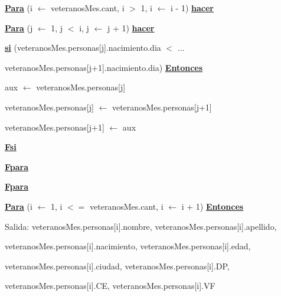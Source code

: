 \documentclass{article}
\begin{document}
            \hspace{12mm}\underline{\textbf{Para}} (i $\leftarrow$ veteranosMes.cant, i $>$ 1, i $\leftarrow$ i - 1) \underline{\textbf{hacer}}
            
                \hspace{16mm}\underline{\textbf{Para}} (j $\leftarrow$ 1, j $<$ i, j $\leftarrow$ j + 1) \underline{\textbf{hacer}}

                    \hspace{20mm}\underline{\textbf{si}} (veteranosMes.personas[j].nacimiento.dia $<$ ...
                    
                        \hspace{34mm}veteranosMes.personas[j+1].nacimiento.dia) \underline{\textbf{Entonces}}

                        \hspace{24mm}aux $\leftarrow$ veteranosMes.personas[j]

                        \hspace{24mm}veteranosMes.personas[j] $\leftarrow$ veteranosMes.personas[j+1]

                        \hspace{24mm}veteranosMes.personas[j+1] $\leftarrow$ aux

                    \hspace{20mm}\underline{\textbf{Fsi}}

                \hspace{16mm}\underline{\textbf{Fpara}}

            \hspace{12mm}\underline{\textbf{Fpara}}
    
            \hspace{12mm}\underline{\textbf{Para}} (i $\leftarrow$ 1, i $<=$ veteranosMes.cant, i $\leftarrow$ i + 1) \underline{\textbf{Entonces}}

                \hspace{16mm}Salida: veteranosMes.personas[i].nombre, veteranosMes.personas[i].apellido, 
                
                \hspace{26mm}veteranosMes.personas[i].nacimiento, veteranosMes.personas[i].edad,
                
                \hspace{26mm}veteranosMes.personas[i].ciudad, veteranosMes.personas[i].DP,
                
                \hspace{26mm}veteranosMes.personas[i].CE, veteranosMes.personas[i].VF
\end{document}
